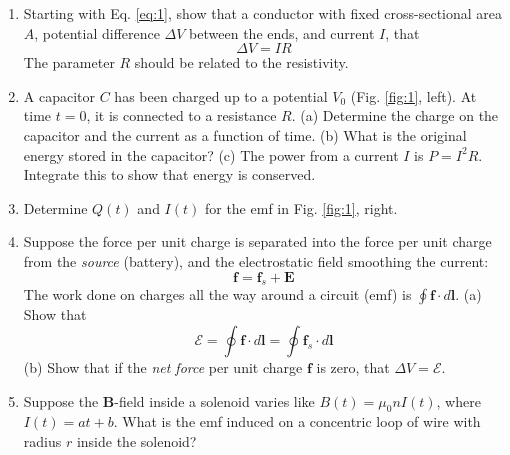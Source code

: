 \documentclass[10pt]{article}
\begin{document}
\begin{enumerate}
\item Starting with Eq. \ref{eq:1}, show that a conductor with fixed cross-sectional area $A$, potential difference $\Delta V$ between the ends, and current $I$, that
\begin{equation}
\Delta V = I R
\end{equation}
The parameter $R$ should be related to the resistivity. \\ \vspace{1cm}
\item A capacitor $C$ has been charged up to a potential $V_0$ (Fig. \ref{fig:1}, left).  At time $t=0$, it is connected to a resistance $R$. (a) Determine the charge on the capacitor and the current as a function of time. (b) What is the original energy stored in the capacitor? (c) The power from a current $I$ is $P=I^2 R$.  Integrate this to show that energy is conserved. \\ \vspace{3cm}
\item Determine $Q(t)$ and $I(t)$ for the emf in Fig. \ref{fig:1}, right. \\ \vspace{3cm}
\item Suppose the force per unit charge is separated into the force per unit charge from the \textit{source} (battery), and the electrostatic field smoothing the current:
\begin{equation}
\mathbf{f} = \mathbf{f}_s + \mathbf{E}
\end{equation}
The work done on charges all the way around a circuit (emf) is $\oint \mathbf{f} \cdot d\mathbf{l}$.  (a) Show that
\begin{equation}
\mathcal{E} = \oint \mathbf{f} \cdot d\mathbf{l} = \oint \mathbf{f}_s \cdot d\mathbf{l}
\end{equation}
(b) Show that if the \textit{net force} per unit charge $\mathbf{f}$ is zero, that $\Delta V = \mathcal{E}$. \\ \vspace{2.0cm}
\item Suppose the $\mathbf{B}$-field inside a solenoid varies like $B(t) = \mu_0 n I(t)$, where $I(t) = at+b$.  What is the emf induced on a concentric loop of wire with radius $r$ inside the solenoid? 
\end{enumerate}
\end{document}

